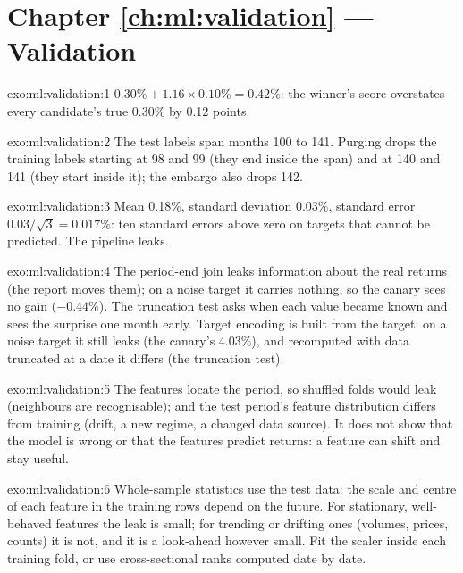 \section*{Chapter \ref{ch:ml:validation} --- Validation}

\begin{solution}{exo:ml:validation:1}
$0.30\% + 1.16\times0.10\% = 0.42\%$: the winner's score overstates every candidate's true 0.30\% by 0.12 points.
\end{solution}

\begin{solution}{exo:ml:validation:2}
The test labels span months 100 to 141. Purging drops the training labels starting at 98 and 99 (they end inside the
span) and at 140 and 141 (they start inside it); the embargo also drops 142.
\end{solution}

\begin{solution}{exo:ml:validation:3}
Mean 0.18\%, standard deviation 0.03\%, standard error $0.03/\sqrt3 = 0.017\%$: ten standard errors above zero on
targets that cannot be predicted. The pipeline leaks.
\end{solution}

\begin{solution}{exo:ml:validation:4}
The period-end join leaks information about the real returns (the report moves them); on a noise target it carries
nothing, so the canary sees no gain ($-0.44\%$). The truncation test asks when each value became known and sees the
surprise one month early. Target encoding is built from the target: on a noise target it still leaks (the canary's
4.03\%), and recomputed with data truncated at a date it differs (the truncation test).
\end{solution}

\begin{solution}{exo:ml:validation:5}
The features locate the period, so shuffled folds would leak (neighbours are recognisable); and the test period's
feature distribution differs from training (drift, a new regime, a changed data source). It does not show that the model
is wrong or that the features predict returns: a feature can shift and stay useful.
\end{solution}

\begin{solution}{exo:ml:validation:6}
Whole-sample statistics use the test data: the scale and centre of each feature in the training rows depend on the
future. For stationary, well-behaved features the leak is small; for trending or drifting ones (volumes, prices,
counts) it is not, and it is a look-ahead however small. Fit the scaler inside each training fold, or use
cross-sectional ranks computed date by date.
\end{solution}

